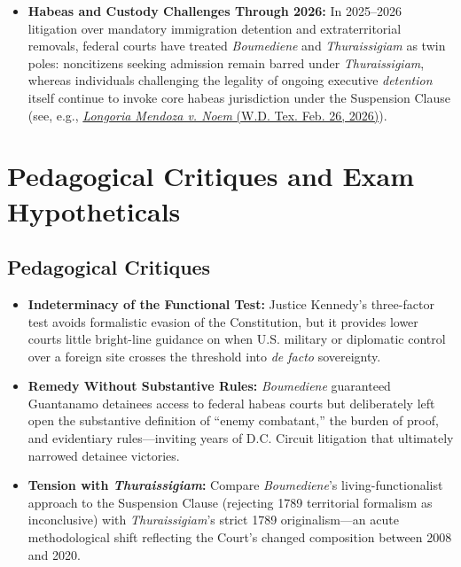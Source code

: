 \documentclass[12pt]{article}
\begin{document}
\begin{itemize}
  \item \textbf{Habeas and Custody Challenges Through 2026:} In 2025--2026 litigation over mandatory immigration detention and extraterritorial removals, federal courts have treated \textit{Boumediene} and \textit{Thuraissigiam} as twin poles: noncitizens seeking admission remain barred under \textit{Thuraissigiam}, whereas individuals challenging the legality of ongoing executive \textit{detention} itself continue to invoke core habeas jurisdiction under the Suspension Clause (see, e.g., \href{https://iptp-production.s3.amazonaws.com/media/documents/2026.02.26_Order_Granting_Writ_of_Habeas_Corpus_-_Longoria_Mendoza_v._Noem.pdf}{\textit{Longoria Mendoza v. Noem} (W.D. Tex. Feb. 26, 2026)}).
\end{itemize}

\section{Pedagogical Critiques and Exam Hypotheticals}
\subsection{Pedagogical Critiques}
\begin{itemize}
  \item \textbf{Indeterminacy of the Functional Test:} Justice Kennedy's three-factor test avoids formalistic evasion of the Constitution, but it provides lower courts little bright-line guidance on when U.S. military or diplomatic control over a foreign site crosses the threshold into \textit{de facto} sovereignty.
  \item \textbf{Remedy Without Substantive Rules:} \textit{Boumediene} guaranteed Guantanamo detainees access to federal habeas courts but deliberately left open the substantive definition of ``enemy combatant,'' the burden of proof, and evidentiary rules---inviting years of D.C. Circuit litigation that ultimately narrowed detainee victories.
  \item \textbf{Tension with \textit{Thuraissigiam}:} Compare \textit{Boumediene}'s living-functionalist approach to the Suspension Clause (rejecting 1789 territorial formalism as inconclusive) with \textit{Thuraissigiam}'s strict 1789 originalism---an acute methodological shift reflecting the Court's changed composition between 2008 and 2020.
\end{itemize}
\end{document}
